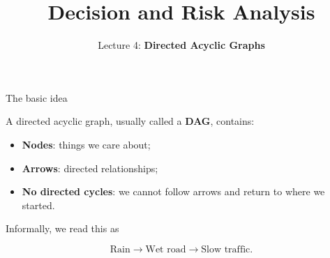\documentclass[aspectratio=43,11pt]{beamer}
\title{Decision and Risk Analysis}
\subtitle{Lecture 4: \textbf{Directed Acyclic Graphs}}
\author{}
\date{
\color{aggiemaroon}{
DAEN 427 / ISEN 427 / ISEN 627 - Fall 2026\\
\textbf{Alexander Abuabara}
}
}
\begin{document}

\begin{frame}
  \titlepage
\end{frame}

\begin{frame}{The basic idea}

A \alert{directed acyclic graph}, usually called a \textbf{DAG},
contains:

\begin{itemize}
  \item \textbf{Nodes}: things we care about;
  \item \textbf{Arrows}: directed relationships;
  \item \textbf{No directed cycles}: we cannot follow arrows and return
        to where we started.
\end{itemize}

\medskip

\begin{center}
\end{center}

\medskip

Informally, we read this as

\[
\text{Rain}
\longrightarrow
\text{Wet road}
\longrightarrow
\text{Slow traffic}.
\]

\end{frame}
\end{document}
